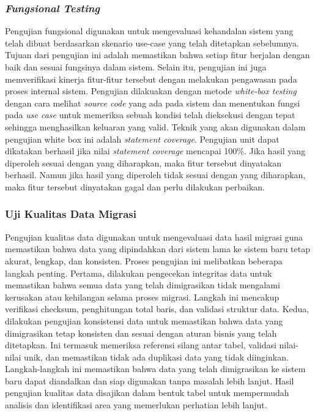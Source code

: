 \subsubsection{\emph{Fungsional Testing}}
Pengujian fungsional digunakan untuk mengevaluasi kehandalan sistem yang telah dibuat berdasarkan skenario use-case yang telah ditetapkan sebelumnya. Tujuan dari pengujian ini adalah memastikan bahwa setiap fitur berjalan dengan baik dan sesuai fungsinya dalam sistem. Selain itu, pengujian ini juga memverifikasi kinerja fitur-fitur tersebut dengan melakukan pengawasan pada proses internal sistem. Pengujian dilakuakan dengan metode \emph{white-box testing} dengan cara melihat \emph{source code} yang ada pada sistem dan menentukan fungsi pada \emph{use case} untuk memeriksa sebuah kondisi telah dieksekusi dengan tepat sehingga menghasilkan keluaran yang valid. Teknik yang akan digunakan dalam pengujian white box ini adalah \emph{statement coverage}. Pengujian unit dapat dikatakan berhasil jika nilai \emph{statement coverage} mencapai 100\%. Jika hasil yang diperoleh sesuai dengan yang diharapkan, maka fitur tersebut dinyatakan berhasil. Namun jika hasil yang diperoleh tidak sesuai dengan yang diharapkan, maka fitur tersebut dinyatakan gagal dan perlu dilakukan perbaikan.

\subsubsection{Uji Kualitas Data Migrasi}
Pengujian kualitas data digunakan untuk mengevaluasi data hasil migrasi guna memastikan bahwa data yang dipindahkan dari sistem lama ke sistem baru tetap akurat, lengkap, dan konsisten. Proses pengujian ini melibatkan beberapa langkah penting. Pertama, dilakukan pengecekan integritas data untuk memastikan bahwa semua data yang telah dimigrasikan tidak mengalami kerusakan atau kehilangan selama proses migrasi. Langkah ini mencakup verifikasi checksum, penghitungan total baris, dan validasi struktur data. Kedua, dilakukan pengujian konsistensi data untuk memastikan bahwa data yang dimigrasikan tetap konsisten dan sesuai dengan aturan bisnis yang telah ditetapkan. Ini termasuk memeriksa referensi silang antar tabel, validasi nilai-nilai unik, dan memastikan tidak ada duplikasi data yang tidak diinginkan. Langkah-langkah ini memastikan bahwa data yang telah dimigrasikan ke sistem baru dapat diandalkan dan siap digunakan tanpa masalah lebih lanjut. Hasil pengujian kualitas data disajikan dalam bentuk tabel untuk mempermudah analisis dan identifikasi area yang memerlukan perhatian lebih lanjut.



